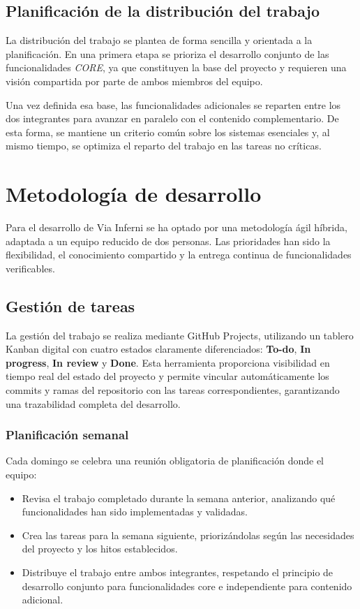 \subsection{Planificación de la distribución del trabajo}

La distribución del trabajo se plantea de forma sencilla y orientada a la planificación. En una 
primera etapa se prioriza el desarrollo conjunto de las funcionalidades \textit{CORE}, ya que 
constituyen la base del proyecto y requieren una visión compartida por parte de ambos miembros 
del equipo.

Una vez definida esa base, las funcionalidades adicionales se reparten entre los dos integrantes 
para avanzar en paralelo con el contenido complementario. De esta forma, se mantiene un criterio 
común sobre los sistemas esenciales y, al mismo tiempo, se optimiza el reparto del trabajo en las 
tareas no críticas.

\section{Metodología de desarrollo}

Para el desarrollo de Via Inferni se ha optado por una metodología ágil híbrida, 
adaptada a un equipo reducido de dos personas. Las prioridades han sido la flexibilidad, 
el conocimiento compartido y la entrega continua de funcionalidades verificables.

\subsection{Gestión de tareas}

La gestión del trabajo se realiza mediante GitHub Projects, utilizando un tablero 
Kanban digital con cuatro estados claramente diferenciados: \textbf{To-do}, 
\textbf{In progress}, \textbf{In review} y \textbf{Done}. Esta herramienta proporciona 
visibilidad en tiempo real del estado del proyecto y permite vincular automáticamente 
los commits y ramas del repositorio con las tareas correspondientes, garantizando una 
trazabilidad completa del desarrollo.

\subsubsection{Planificación semanal}

Cada domingo se celebra una reunión obligatoria de planificación donde el equipo:
\begin{itemize}
    \item Revisa el trabajo completado durante la semana anterior, analizando qué 
    funcionalidades han sido implementadas y validadas.
    \item Crea las tareas para la semana siguiente, priorizándolas según las necesidades 
    del proyecto y los hitos establecidos.
    \item Distribuye el trabajo entre ambos integrantes, respetando el principio de 
    desarrollo conjunto para funcionalidades core e independiente para contenido adicional.
\end{itemize}

